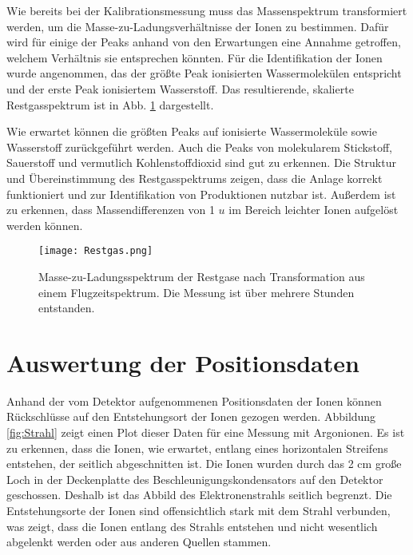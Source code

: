 Wie bereits bei der Kalibrationsmessung muss das Massenspektrum transformiert werden, um die Masse-zu-Ladungsverhältnisse der Ionen zu bestimmen. Dafür wird für einige der Peaks anhand von den Erwartungen eine Annahme getroffen, welchem Verhältnis sie entsprechen könnten. Für die Identifikation der Ionen wurde angenommen, das der größte Peak ionisierten Wassermolekülen
entspricht und der erste Peak ionisiertem Wasserstoff. Das resultierende, skalierte Restgasspektrum ist in Abb. \ref{fig:rest} dargestellt.

Wie erwartet können die größten Peaks auf ionisierte Wassermoleküle sowie Wasserstoff zurückgeführt werden. Auch die Peaks von molekularem Stickstoff, Sauerstoff und vermutlich Kohlenstoffdioxid sind gut zu erkennen. Die Struktur und Übereinstimmung des Restgasspektrums zeigen, dass die Anlage korrekt funktioniert und zur Identifikation von Produktionen nutzbar ist. Außerdem ist zu erkennen, dass Massendifferenzen von 1 $u$ im Bereich leichter Ionen aufgelöst werden können. 

\begin{figure}[h]
    \centering
    \hspace*{-1cm}
    \texttt{[image: Restgas.png]}
    \caption[Masse-zu-Ladungsspektrum der Restgase]{Masse-zu-Ladungsspektrum der Restgase nach Transformation aus einem Flugzeitspektrum. Die Messung ist über mehrere Stunden entstanden.}
    \label{fig:rest}
\end{figure}

\section{Auswertung der Positionsdaten}
Anhand der vom Detektor aufgenommenen Positionsdaten der Ionen können Rückschlüsse auf den Entstehungsort der Ionen gezogen werden. Abbildung \ref{fig:Strahl} zeigt einen Plot dieser Daten für eine Messung mit Argonionen. Es ist zu erkennen, dass die Ionen, wie erwartet, entlang eines horizontalen Streifens entstehen, der seitlich abgeschnitten ist. Die Ionen wurden durch das 2 cm große Loch in der Deckenplatte des Beschleunigungskondensators auf den Detektor geschossen. Deshalb ist das Abbild des Elektronenstrahls seitlich begrenzt. Die Entstehungsorte der Ionen sind offensichtlich stark mit dem Strahl verbunden, was zeigt, dass die Ionen entlang des Strahls entstehen und nicht wesentlich abgelenkt werden oder aus anderen Quellen stammen.

